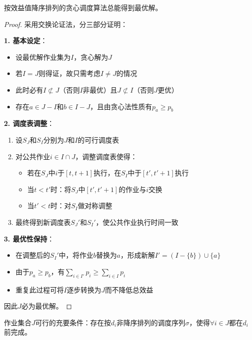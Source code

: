 \documentclass[./../main.tex]{subfiles}
\begin{document}
\begin{theorem}
按效益值降序排列的贪心调度算法总能得到最优解。
\end{theorem}

\begin{proof}
采用交换论证法，分三部分证明：

\textbf{1. 基本设定}：
\begin{itemize}
\item 设最优解作业集为$I$，贪心解为$J$
\item 若$I=J$则得证，故只需考虑$I \neq J$的情况
\item 此时必有$I \not\subset J$（否则$I$非最优）且$J \not\subset I$（否则$J$更优）
\item 存在$a \in J-I$和$b \in I-J$，且由贪心法性质有$p_a \geq p_b$
\end{itemize}

\textbf{2. 调度表调整}：
\begin{enumerate}
\item 设$S_J$和$S_I$分别为$J$和$I$的可行调度表
\item 对公共作业$i \in I \cap J$，调整调度表使得：
\begin{itemize}
\item 若在$S_J$中$i$于$[t,t+1]$执行，在$S_I$中于$[t',t'+1]$执行
\item 当$t < t'$时：将$S_J$中$[t',t'+1]$的作业与$i$交换
\item 当$t' < t$时：对$S_I$做对称调整
\end{itemize}
\item 最终得到新调度表$S_J'$和$S_I'$，使公共作业执行时间一致
\end{enumerate}

\textbf{3. 最优性保持}：
\begin{itemize}
\item 在调整后的$S_I'$中，将作业$b$替换为$a$，形成新解$I' = (I-\{b\})\cup\{a\}$
\item 由于$p_a \geq p_b$，有$\sum_{i \in I'} p_i \geq \sum_{i \in I} p_i$
\item 重复此过程可将$I$逐步转换为$J$而不降低总效益
\end{itemize}

因此$J$必为最优解。
\end{proof}

\begin{theorem}
    作业集合$J$可行的充要条件：存在按$d_i$非降序排列的调度序列$\sigma$，使得$\forall i \in J$都在$d_i$前完成。
\end{theorem}
\end{document}
